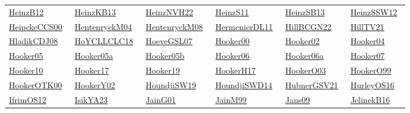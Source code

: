 \begin{longtable}{*{6}{l}}
\href{../works/HeinzB12.pdf}{HeinzB12}~\cite{HeinzB12} & \href{../works/HeinzKB13.pdf}{HeinzKB13}~\cite{HeinzKB13} & \href{../works/HeinzNVH22.pdf}{HeinzNVH22}~\cite{HeinzNVH22} & \href{../works/HeinzS11.pdf}{HeinzS11}~\cite{HeinzS11} & \href{../works/HeinzSB13.pdf}{HeinzSB13}~\cite{HeinzSB13} & \href{../works/HeinzSSW12.pdf}{HeinzSSW12}~\cite{HeinzSSW12}\\ 
\href{../works/HeipckeCCS00.pdf}{HeipckeCCS00}~\cite{HeipckeCCS00} & \href{../works/HentenryckM04.pdf}{HentenryckM04}~\cite{HentenryckM04} & \href{../works/HentenryckM08.pdf}{HentenryckM08}~\cite{HentenryckM08} & \href{../works/HermenierDL11.pdf}{HermenierDL11}~\cite{HermenierDL11} & \href{../}{HillBCGN22}~\cite{HillBCGN22} & \href{../works/HillTV21.pdf}{HillTV21}~\cite{HillTV21}\\ 
\href{../}{HladikCDJ08}~\cite{HladikCDJ08} & \href{../works/HoYCLLCLC18.pdf}{HoYCLLCLC18}~\cite{HoYCLLCLC18} & \href{../works/HoeveGSL07.pdf}{HoeveGSL07}~\cite{HoeveGSL07} & \href{../}{Hooker00}~\cite{Hooker00} & \href{../}{Hooker02}~\cite{Hooker02} & \href{../works/Hooker04.pdf}{Hooker04}~\cite{Hooker04}\\ 
\href{../works/Hooker05.pdf}{Hooker05}~\cite{Hooker05} & \href{../works/Hooker05a.pdf}{Hooker05a}~\cite{Hooker05a} & \href{../works/Hooker05b.pdf}{Hooker05b}~\cite{Hooker05b} & \href{../works/Hooker06.pdf}{Hooker06}~\cite{Hooker06} & \href{../}{Hooker06a}~\cite{Hooker06a} & \href{../works/Hooker07.pdf}{Hooker07}~\cite{Hooker07}\\ 
\href{../}{Hooker10}~\cite{Hooker10} & \href{../works/Hooker17.pdf}{Hooker17}~\cite{Hooker17} & \href{../works/Hooker19.pdf}{Hooker19}~\cite{Hooker19} & \href{../works/HookerH17.pdf}{HookerH17}~\cite{HookerH17} & \href{../works/HookerO03.pdf}{HookerO03}~\cite{HookerO03} & \href{../}{HookerO99}~\cite{HookerO99}\\ 
\href{../}{HookerOTK00}~\cite{HookerOTK00} & \href{../works/HookerY02.pdf}{HookerY02}~\cite{HookerY02} & \href{../works/HoundjiSW19.pdf}{HoundjiSW19}~\cite{HoundjiSW19} & \href{../works/HoundjiSWD14.pdf}{HoundjiSWD14}~\cite{HoundjiSWD14} & \href{../works/HubnerGSV21.pdf}{HubnerGSV21}~\cite{HubnerGSV21} & \href{../works/HurleyOS16.pdf}{HurleyOS16}~\cite{HurleyOS16}\\ 
\href{../works/IfrimOS12.pdf}{IfrimOS12}~\cite{IfrimOS12} & \href{../works/IsikYA23.pdf}{IsikYA23}~\cite{IsikYA23} & \href{../works/JainG01.pdf}{JainG01}~\cite{JainG01} & \href{../works/JainM99.pdf}{JainM99}~\cite{JainM99} & \href{../works/Jans09.pdf}{Jans09}~\cite{Jans09} & \href{../works/JelinekB16.pdf}{JelinekB16}~\cite{JelinekB16}\\ 

\end{longtable}
